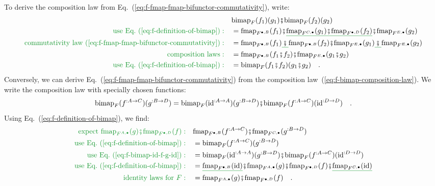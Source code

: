 To derive the composition law from Eq.~(\ref{eq:f-fmap-fmap-bifunctor-commutativity}),
write:
\begin{align*}
 & \text{bimap}_{F}(f_{1})(g_{1})\bef\text{bimap}_{F}(f_{2})(g_{2})\\
{\color{greenunder}\text{use Eq.~(\ref{eq:f-definition-of-bimap})}:}\quad & =\text{fmap}_{F^{\bullet,B}}(f_{1})\bef\gunderline{\text{fmap}_{F^{C,\bullet}}(g_{1})\bef\text{fmap}_{F^{\bullet,D}}(f_{2})}\bef\text{fmap}_{F^{E,\bullet}}(g_{2})\\
{\color{greenunder}\text{commutativity law~(\ref{eq:f-fmap-fmap-bifunctor-commutativity})}:}\quad & =\text{fmap}_{F^{\bullet,B}}(f_{1})\gunderline{\,\bef\,}\text{fmap}_{F^{\bullet,B}}(f_{2})\bef\text{fmap}_{F^{E,\bullet}}(g_{1})\gunderline{\,\bef\,}\text{fmap}_{F^{E,\bullet}}(g_{2})\\
{\color{greenunder}\text{composition laws}:}\quad & =\text{fmap}_{F^{\bullet,B}}(f_{1}\bef f_{2})\bef\text{fmap}_{F^{E,\bullet}}(g_{1}\bef g_{2})\\
{\color{greenunder}\text{use Eq.~(\ref{eq:f-definition-of-bimap})}:}\quad & =\text{bimap}_{F}(f_{1}\bef f_{2})(g_{1}\bef g_{2})\quad.
\end{align*}
Conversely, we can derive Eq.~(\ref{eq:f-fmap-fmap-bifunctor-commutativity})
from the composition law~(\ref{eq:f-bimap-composition-law}). We
write the composition law with specially chosen functions:
\begin{equation}
\text{bimap}_{F}(f^{:A\rightarrow C})(g^{:B\rightarrow D})=\text{bimap}_{F}(\text{id}^{:A\rightarrow A})(g^{:B\rightarrow D})\bef\text{bimap}_{F}(f^{:A\rightarrow C})(\text{id}^{:D\rightarrow D})\quad.\label{eq:f-bimap-id-f-g-id}
\end{equation}
Using Eq.~(\ref{eq:f-definition-of-bimap}), we find:
\begin{align*}
{\color{greenunder}\text{expect }\text{fmap}_{F^{A,\bullet}}(g)\bef\text{fmap}_{F^{\bullet,D}}(f):}\quad & \text{fmap}_{F^{\bullet,B}}(f^{:A\rightarrow C})\bef\text{fmap}_{F^{C,\bullet}}(g^{:B\rightarrow D})\\
{\color{greenunder}\text{use Eq.~(\ref{eq:f-definition-of-bimap})}:}\quad & =\text{bimap}_{F}(f^{:A\rightarrow C})(g^{:B\rightarrow D})\\
{\color{greenunder}\text{use Eq.~(\ref{eq:f-bimap-id-f-g-id})}:}\quad & =\text{bimap}_{F}(\text{id}^{:A\rightarrow A})(g^{:B\rightarrow D})\bef\text{bimap}_{F}(f^{:A\rightarrow C})(\text{id}^{:D\rightarrow D})\\
{\color{greenunder}\text{use Eq.~(\ref{eq:f-definition-of-bimap})}:}\quad & =\gunderline{\text{fmap}_{F^{\bullet,B}}(\text{id})}\bef\text{fmap}_{F^{A,\bullet}}(g)\bef\text{fmap}_{F^{\bullet,D}}(f)\bef\gunderline{\text{fmap}_{F^{C,\bullet}}(\text{id})}\\
{\color{greenunder}\text{identity laws for }F:}\quad & =\text{fmap}_{F^{A,\bullet}}(g)\bef\text{fmap}_{F^{\bullet,D}}(f)\quad.
\end{align*}

